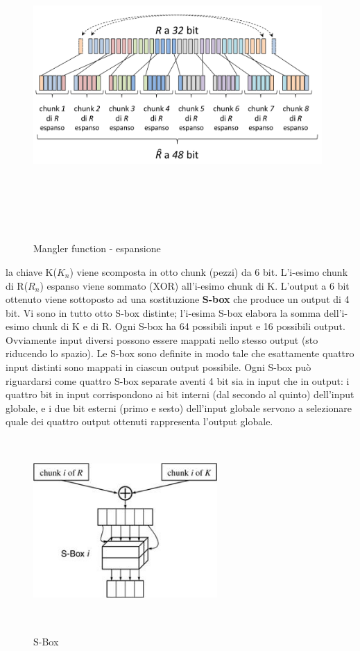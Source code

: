 \begin{figure}[htbp]
	\centering%
	\subfigure%
	{\includegraphics[height=11cm, width=11cm, keepaspectratio]{Immagini/chiave_segreta/mangler_exp.png}}
	\caption{Mangler function - espansione \label{fig:mangler_exp}} 	
\end{figure}
\newline
la chiave K($K_{n}$) viene scomposta in otto chunk (pezzi) da 6 bit. L'i-esimo chunk di R($R_{n}$) espanso viene sommato (XOR) all’i-esimo chunk di K. L'output a 6 bit ottenuto viene sottoposto ad una sostituzione \textbf{S-box} che produce un output di 4 bit. Vi sono in tutto otto S-box distinte; l’i-esima S-box elabora la somma dell’i-esimo chunk di K e di R. Ogni S-box ha 64 possibili input e 16 possibili output. Ovviamente input diversi possono essere mappati nello stesso output (sto riducendo lo spazio). Le S-box sono definite in modo tale che esattamente quattro
input distinti sono mappati in ciascun output possibile. Ogni S-box può riguardarsi come quattro S-box separate aventi 4 bit sia in input che in output: i quattro bit in input corrispondono ai bit interni (dal secondo al quinto) dell'input globale, e i due bit esterni (primo e sesto) dell’input globale servono a selezionare quale dei quattro output ottenuti rappresenta l'output globale.
\begin{figure}[htbp]
	\centering%
	\subfigure%
	{\includegraphics[height=7cm, width=7cm, keepaspectratio]{Immagini/chiave_segreta/sbox.png}}
	\caption{S-Box \label{fig:sbox}} 	
\end{figure}
